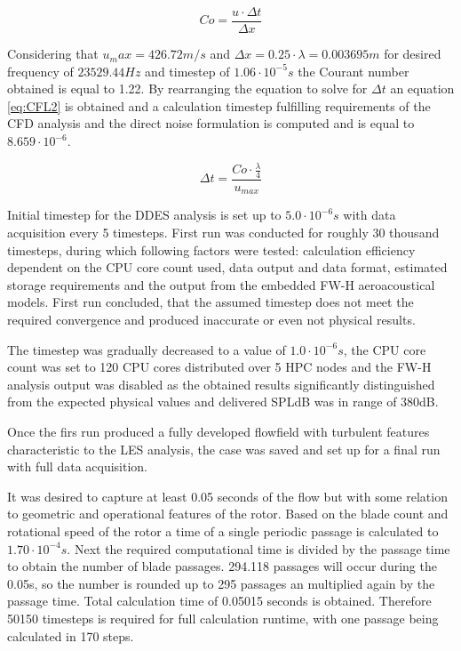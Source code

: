 \begin{equation} \label{eq:CFL}
Co = \frac{u \cdot \Delta t}{\Delta x}
\end{equation}

Considering that $u_max = 426.72 m/s$ and $\Delta x = 0.25 \cdot \lambda = 0.003695 m$ for desired frequency of $23529.44 Hz$ and timestep of  $1.06 \cdot 10^{-5}s$ the Courant number obtained is equal to 1.22. By rearranging the equation to solve for $\Delta t$ an equation \ref{eq:CFL2} is obtained and a calculation timestep fulfilling requirements of the CFD analysis and the direct noise formulation is computed and is equal to $8.659 \cdot 10^{-6}$.

\begin{equation} \label{eq:CFL2}
\Delta t = \frac{Co \cdot \frac{\lambda}{4}}{u_{max}}
\end{equation}

Initial timestep for the DDES analysis is set up to $5.0 \cdot 10^{-6}s$ with data acquisition every 5 timesteps. First run was conducted for roughly 30 thousand timesteps, during which following factors were tested: calculation efficiency dependent on the CPU core count used, data output and data format, estimated storage requirements and the output from the embedded FW-H aeroacoustical models. First run concluded, that the assumed timestep does not meet the required convergence and produced inaccurate or even not physical results.

The timestep was gradually decreased to a value of $1.0 \cdot 10^{-6}s$, the CPU core count was set to 120 CPU cores distributed over 5 HPC nodes and the FW-H analysis output was disabled as the obtained results significantly distinguished from the expected physical values and delivered SPLdB was in range of 380dB.

Once the firs run produced a fully developed flowfield with turbulent features characteristic to the LES analysis, the case was saved and set up for a final run with full data acquisition. 

It was desired to capture at least 0.05 seconds of the flow but with some relation to geometric and operational features of the rotor. Based on the blade count and rotational speed of the rotor a time of a single periodic passage is calculated to $1.70 \cdot 10^{-4}s$. Next the required computational time is divided by the passage time to obtain the number of blade passages. 294.118 passages will occur during the 0.05s, so the number is rounded up to 295 passages an multiplied again by the passage time. Total calculation time of 0.05015 seconds is obtained. Therefore 50150 timesteps is required for full calculation runtime, with one passage being calculated in 170 steps.


